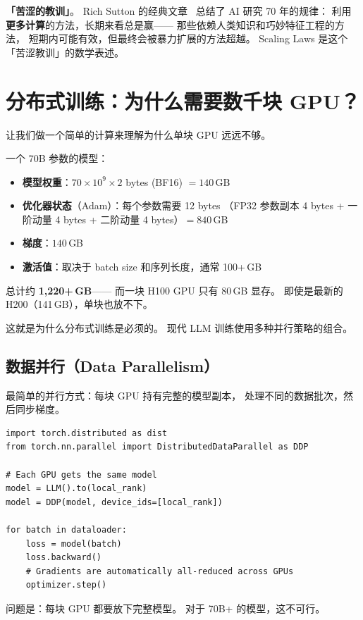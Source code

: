 \textbf{「苦涩的教训」}。
Rich Sutton 的经典文章~\cite{sutton2019bitterlesson}
总结了 AI 研究 70 年的规律：
利用\textbf{更多计算}的方法，长期来看总是赢——
那些依赖人类知识和巧妙特征工程的方法，
短期内可能有效，但最终会被暴力扩展的方法超越。
Scaling Laws 是这个「苦涩教训」的数学表述。

\section{分布式训练：为什么需要数千块 GPU？}

让我们做一个简单的计算来理解为什么单块 GPU 远远不够。

一个 70B 参数的模型：
\begin{itemize}[noitemsep]
  \item \textbf{模型权重}：$70 \times 10^9 \times 2$ bytes (BF16) $= 140$\,GB
  \item \textbf{优化器状态}（Adam）：每个参数需要 12 bytes
        （FP32 参数副本 4 bytes + 一阶动量 4 bytes + 二阶动量 4 bytes）$= 840$\,GB
  \item \textbf{梯度}：$140$\,GB
  \item \textbf{激活值}：取决于 batch size 和序列长度，通常 100+\,GB
\end{itemize}
总计约 \textbf{1,220+\,GB}——
而一块 H100 GPU 只有 80\,GB 显存。
即使是最新的 H200（141\,GB），单块也放不下。

这就是为什么分布式训练是必须的。
现代 LLM 训练使用多种并行策略的组合。

\subsection{数据并行（Data Parallelism）}

最简单的并行方式：每块 GPU 持有完整的模型副本，
处理不同的数据批次，然后同步梯度。

\begin{lstlisting}[caption={Distributed Data Parallel in PyTorch}]
import torch.distributed as dist
from torch.nn.parallel import DistributedDataParallel as DDP

# Each GPU gets the same model
model = LLM().to(local_rank)
model = DDP(model, device_ids=[local_rank])

for batch in dataloader:
    loss = model(batch)
    loss.backward()
    # Gradients are automatically all-reduced across GPUs
    optimizer.step()
\end{lstlisting}

问题是：每块 GPU 都要放下完整模型。
对于 70B+ 的模型，这不可行。

